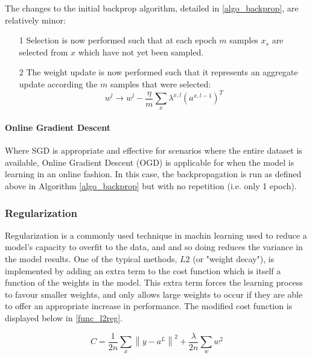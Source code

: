 \documentclass[a4paper,11pt,oneside]{article}
\theoremstyle{plain}
\theoremstyle{definition}
\begin{document}
The changes to the initial backprop algorithm, detailed in \ref{algo_backprop}, are relatively minor:
\begin{itemize}
	\item [1] Selection is now performed such that at each epoch $m$ samples $x_s$ are selected from $x$ which have not yet been sampled.
	\item [2] The weight update is now performed such that it represents an aggregate update according the $m$ samples that were selected:
			\begin{equation}\label{eq_backprop_weightupdate_sgd}
			w^l \rightarrow w^l - \frac{\eta}{m} \sum_{x} \lambda^{x, l} (a^{x, l - 1})^T
			\end{equation}
\end{itemize}

\texttt{}\newline 

\paragraph{Online Gradient Descent}
Where SGD is appropriate and effective for scenarios where the entire dataset is available, Online Gradient Descent (OGD) is applicable for when the model is learning in an online fashion. In this case, the backpropagation is run as defined above in Algorithm \ref{algo_backprop} but with no repetition (i.e. only 1 epoch).

\subsubsection{Regularization}\label{imp_regularization}

Regularization is a commonly used technique in machin learning used to reduce a model's capacity to overfit to the data, and and so doing reduces the variance in the model results. One of the typical methods, $L2$ (or "weight decay"), is implemented by adding an extra term to the cost function which is itself a function of the weights in the model. This extra term forces the learning process to favour smaller weights, and only allows large weights to occur if they are able to offer an appropriate increase in performance. The modified cost function is displayed below in \ref{func_l2reg}.

\begin{equation}\label{func_l2reg}
C=\frac{1}{2 n} \sum_{x}\left\|y-a^{L}\right\|^{2}+\frac{\lambda}{2 n} \sum_{w} w^{2}
\end{equation}
\end{document}
